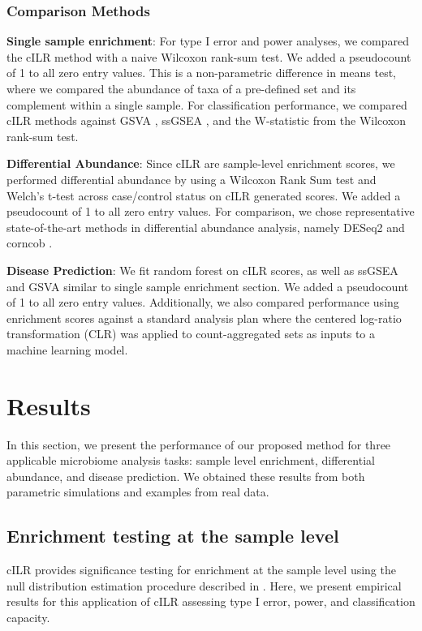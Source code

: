 \documentclass[10pt,letterpaper]{article}
\begin{document}
\subsubsection*{Comparison Methods}

\noindent \textbf{Single sample enrichment}: For type I error and power analyses, we compared the cILR method with a naive Wilcoxon rank-sum test. We added a pseudocount of 1 to all zero entry values. This is a non-parametric difference in means test, where we compared the abundance of taxa of a pre-defined set and its complement within a single sample. For classification performance, we compared cILR methods against GSVA \cite{hanzelmann2013}, ssGSEA \cite{barbie2009}, and the W-statistic from the Wilcoxon rank-sum test.

\noindent \textbf{Differential Abundance}: Since cILR are sample-level enrichment scores, we performed differential abundance by using a Wilcoxon Rank Sum test and Welch's t-test across case/control status on cILR generated scores. We added a pseudocount of 1 to all zero entry values. For comparison, we chose representative state-of-the-art methods in differential abundance analysis, namely DESeq2 \cite{love2014,mcmurdie2014} and corncob \cite{martin2020}. 

\noindent \textbf{Disease Prediction}: We fit random forest on cILR scores, as well as ssGSEA \cite{hanzelmann2013} and GSVA \cite{barbie2009} similar to single sample enrichment section. We added a pseudocount of 1 to all zero entry values. Additionally, we also compared performance using enrichment scores against a standard analysis plan where the centered log-ratio transformation (CLR) was applied to count-aggregated sets as inputs to a machine learning model.  

\section*{Results}
In this section, we present the performance of our proposed method for three applicable microbiome analysis tasks: sample level enrichment, differential abundance, and disease prediction. We obtained these results from both parametric simulations and examples from real data.  

\subsection*{Enrichment testing at the sample level}
cILR provides significance testing for enrichment at the sample level using the null distribution estimation procedure described in . Here, we present empirical results for this application of cILR assessing type I error, power, and classification capacity. 
\end{document}

